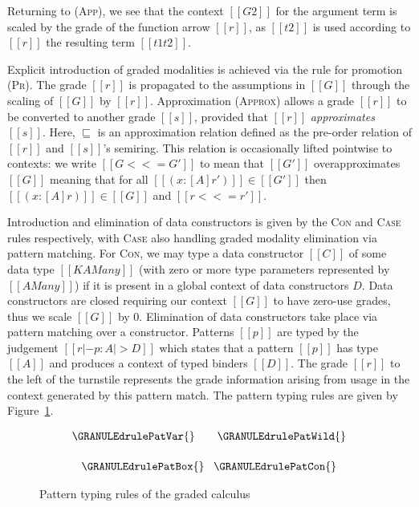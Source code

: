 Returning to (\textsc{App}), we see that the context $[[ G2 ]]$ for the argument term
is scaled by the grade of the function arrow $[[ r ]]$, as $[[ t2 ]]$ is used according to $[[ r ]]$ the resulting term $[[ t1 t2 ]]$.

Explicit introduction of graded modalities is achieved via the rule for promotion
(\textsc{Pr}). The grade $[[ r ]]$ is propagated to the assumptions in
$[[ G ]]$ through the scaling of $[[G]]$ by $[[r]]$.
Approximation (\textsc{Approx}) allows a grade $[[ r ]]$ to be converted to another grade $[[ s ]]$, provided that $[[ r ]]$ \textit{approximates} $[[ s ]]$.
Here, $\sqsubseteq$ is an approximation relation defined as the pre-order relation
of $[[ r ]]$ and $[[ s ]]$'s semiring. This relation is occasionally lifted
pointwise to contexts: we write $[[ G <<= G' ]]$ to mean that $[[ G' ]]$
overapproximates $[[ G ]]$ meaning that for all $[[ (x : [A] r') ]] \in [[ G' ]]$
then $[[ (x : [A] r) ]] \in [[ G ]]$ and $[[ r <<= r' ]]$.


Introduction and elimination of data constructors is given by
the \textsc{Con} and \textsc{Case} rules respectively,
with \textsc{Case} also handling graded modality elimination via
pattern matching. For \textsc{Con}, we may type a data constructor
$[[C]]$ of some data type $[[ K {A Many }]]$ (with zero or more type
parameters represented by $[[ A Many ]]$) if it is present in a global
context of data constructors $D$. Data constructors are closed
requiring our context $[[ G ]]$ to have zero-use grades, thus we scale
$[[G]]$ by $0$. Elimination of data constructors take place via
pattern matching over a constructor. Patterns $[[p]]$ are typed by the
judgement $[[ r |- p : A |> D ]]$ which states that a pattern $[[p]]$
has type $[[A]]$ and produces a context of typed binders $[[D]]$. The
grade $[[r]]$ to the left of the turnstile represents the grade
information arising from usage in the context generated by this
pattern match. The pattern typing rules are given by
Figure~\ref{fig:pat-typing}.


\begin{figure}[t]
\begin{align*}
\begin{array}{c}
\GRANULEdrulePatVar{}
\qquad
\GRANULEdrulePatWild{}
\\[1.5em]
\GRANULEdrulePatBox{}
\;\;\;
\GRANULEdrulePatCon{}
\end{array}
\vspace{-0.5em}
\end{align*}
  \caption{Pattern typing rules of the graded calculus}
\label{fig:pat-typing}
 \end{figure}


